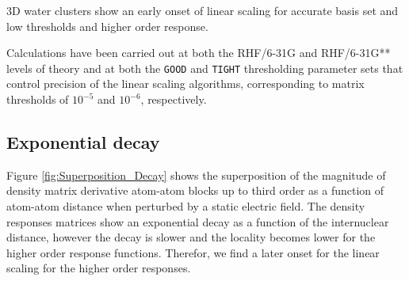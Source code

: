 \documentclass[prl,aps,twocolumn,showpacs,twocolumngrid,superbib]{revtex4}
\begin{document}
3D water clusters show an early onset of linear scaling for accurate
basis set and low thresholds and higher order response.


Calculations have been carried out at both the RHF/6-31G and RHF/6-31G** levels of
theory and at both the {\tt GOOD} and {\tt TIGHT} thresholding parameter 
sets that control precision of the linear scaling algorithms, corresponding 
to matrix thresholds of $10^{-5}$ and $10^{-6}$, respectively.



\subsection{Exponential decay}
Figure \ref{fig:Superposition_Decay} shows the superposition 
of the magnitude of density matrix derivative atom-atom blocks up to 
third order as a function of atom-atom distance when perturbed by 
a static electric field. 
The density responses matrices show an exponential decay as a function
of the internuclear distance, however the decay is slower and the locality
becomes lower for the higher order response functions.
Therefor, we find a later onset for the linear scaling for the higher order
responses. 
\end{document}
